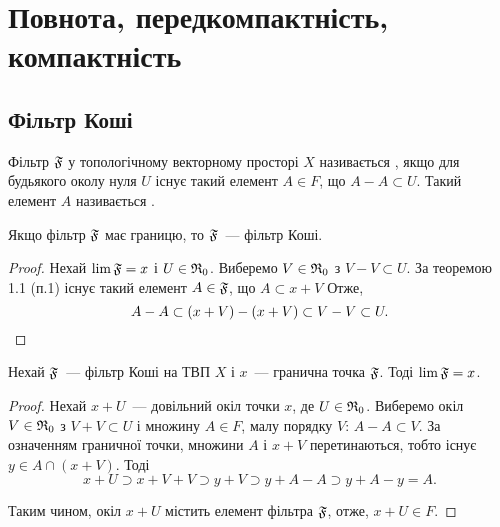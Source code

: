 \chapter{Повнота, передкомпактність, компактність}

\section{Фільтр Коші}

\begin{definition}
    Фільтр $\frak F$ у топологічному векторному просторі $X$ називається , якщо для будьякого околу нуля $U$ існує такий елемент $A \in F$, що $A - A \subset U$. Такий елемент $A$ називається .
\end{definition}

\begin{theorem}
    Якщо фільтр $\frak F$ має границю, то $\frak F$~--- фільтр Коші.
\end{theorem}

\begin{proof}
    Нехай $\lim \frak F = x$ і $U \in \frak R_0$. Виберемо $V \in \frak R_0$ з $V - V \subset U$. За теоремою 1.1 (п.1) існує такий елемент $A \in \frak F$, що $A \subset x + V$ Отже,
    \begin{equation*}
        A - A \subset (x + V) - (x + V) \subset V - V \subset U. \qedhere
    \end{equation*}
\end{proof}

\begin{theorem}
    Нехай $\frak F$~--- фільтр Коші на ТВП $X$ і $x$~--- гранична точка $\frak F$. Тоді $\lim \frak F = x$.
\end{theorem}

\begin{proof}
    Нехай $x + U$~--- довільний окіл точки $x$, де $U \in \frak R_0$. Виберемо окіл $V \in \frak R_0$ з $V + V \subset U$ і множину $A \in F$, малу порядку $V$: $A - A \subset V$. За означенням граничної точки, множини $A$ і $x + V$ перетинаються, тобто існує $y \in A \cap (x + V)$. Тоді
    \begin{equation*}
        x + U \supset x + V + V \supset y + V \supset y + A - A \supset y + A - y = A.
    \end{equation*}

    Таким чином, окіл $x + U$ містить елемент фільтра $\frak F$, отже, $x + U \in F$.
\end{proof}

